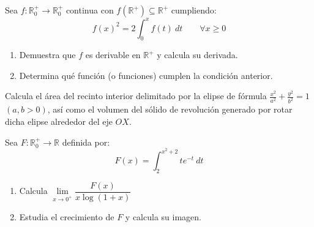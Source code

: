 \documentclass[12pt]{article}
\begin{document}
    \begin{ejercicio}[2 puntos]
        Sea $f:\mathbb{R}^+_0\longrightarrow\mathbb{R}^+_0$ continua con $f(\mathbb{R}^+) \subseteq \mathbb{R}^+$ cumpliendo:
        \begin{equation*}
            f(x)^2 = 2\int_{0}^{x} f(t)~dt \qquad \forall x\geq 0
        \end{equation*}
        \begin{enumerate}[label=\alph*)]
            \item Demuestra que $f$ es derivable en $\mathbb{R}^+$ y calcula su derivada.
            \item Determina qué función (o funciones) cumplen la condición anterior.
        \end{enumerate}
    \end{ejercicio}

    \begin{ejercicio}[2 puntos]
        Calcula el área del recinto interior delimitado por la elipse de fórmula $\frac{x^2}{a^2}+\frac{y^2}{b^2} = 1$ $(a,b>0)$, así como el volumen del sólido de revolución generado por rotar dicha elipse alrededor del eje $OX$.
    \end{ejercicio}

    \begin{ejercicio}[2 puntos]
        Sea $F:\mathbb{R}^+_0\longrightarrow \mathbb{R}$ definida por:
        \begin{equation*}
            F(x) = \int_{2}^{x^2+2} te^{-t}~dt 
        \end{equation*}
        \begin{enumerate}[label=\alph*)]
            \item Calcula $\lim\limits_{x\to0^+}\dfrac{F(x)}{x\log(1+x)}$
            \item Estudia el crecimiento de $F$ y calcula su imagen.
        \end{enumerate}
    \end{ejercicio}
    
    
    
    \newpage
\end{document}
